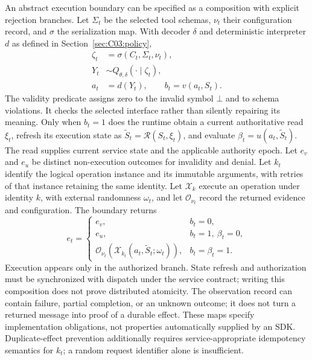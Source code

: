 An abstract execution boundary can be specified as a composition with explicit rejection branches. Let $\Sigma_t$ be the selected tool schemas, $\nu_t$ their configuration record, and $\sigma$ the serialization map. With decoder $\delta$ and deterministic interpreter $d$ as defined in Section~\ref{sec:C03:policy},
\begin{equation}
\begin{aligned}
 \zeta_t&=\sigma(C_t,\Sigma_t,\nu_t),\\
 Y_t&\sim Q_{\theta,\delta}(\cdot\mid\zeta_t),\\
 a_t&=d(Y_t),\qquad b_t=v(a_t,S_t).
\end{aligned}
\label{eq:C03:invocationproposal}
\end{equation}
The validity predicate assigns zero to the invalid symbol $\bot$ and to schema violations. It checks the selected interface rather than silently repairing its meaning. Only when $b_t=1$ does the runtime obtain a current authoritative read $\xi_t$, refresh its execution state as $\widetilde S_t=\mathcal R(S_t,\xi_t)$, and evaluate $\beta_t=u(a_t,\widetilde S_t)$. The read supplies current service state and the applicable authority epoch. Let $e_v$ and $e_u$ be distinct non-execution outcomes for invalidity and denial. Let $k_t$ identify the logical operation instance and its immutable arguments, with retries of that instance retaining the same identity. Let $\mathcal X_k$ execute an operation under identity $k$, with external randomness $\omega_t$, and let $\mathcal O_{\nu_t}$ record the returned evidence and configuration. The boundary returns
\begin{equation}
 e_t=
 \begin{cases}
 e_v,&b_t=0,\\
 e_u,&b_t=1,\ \beta_t=0,\\
 \mathcal O_{\nu_t}\!\left(
 \mathcal X_{k_t}(a_t,\widetilde S_t;\omega_t)\right),
 &b_t=\beta_t=1.
 \end{cases}
\label{eq:C03:invocationboundary}
\end{equation}
Execution appears only in the authorized branch. State refresh and authorization must be synchronized with dispatch under the service contract; writing this composition does not prove distributed atomicity. The observation record can contain failure, partial completion, or an unknown outcome; it does not turn a returned message into proof of a durable effect. These maps specify implementation obligations, not properties automatically supplied by an SDK. Duplicate-effect prevention additionally requires service-appropriate idempotency semantics for $k_t$; a random request identifier alone is insufficient.

